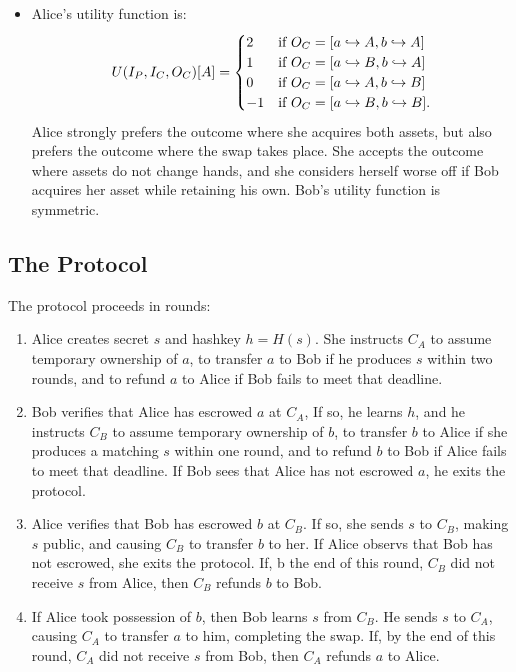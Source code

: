 \begin{itemize}
\item
Alice's utility function is:
\begin{equation}
  \eqnlabel{aliceUtility}
  U(I_P,I_C,O_C)[A] =
  \begin{cases}
    2 &\text{if } O_C = [a \hookrightarrow A, b \hookrightarrow A]\\
    1 &\text{if } O_C = [a \hookrightarrow B, b \hookrightarrow A]\\
    0 &\text{if } O_C = [a \hookrightarrow A, b \hookrightarrow B]\\
    -1 &\text{if } O_C = [a \hookrightarrow B, b \hookrightarrow B].
  \end{cases}
\end{equation}
Alice strongly prefers the outcome where she acquires both assets,
but also prefers the outcome where the swap takes place.
She accepts the outcome where assets do not change hands,
and she considers herself worse off
if Bob acquires her asset while retaining his own.
Bob's utility function is symmetric.
\end{itemize}

\subsection{The Protocol}

The protocol proceeds in rounds:
\begin{enumerate}
\item\label{aliceEscrows}
  Alice creates secret $s$ and hashkey $h=H(s)$.
  She instructs $C_A$ to assume temporary ownership of $a$,
  to transfer $a$ to Bob if he produces $s$ within two rounds,
  and to refund $a$ to Alice if Bob fails to meet that deadline.

\item\label{bobEscrows}
  Bob verifies that Alice has escrowed $a$ at $C_A$,
  If so, he learns $h$,
  and he instructs $C_B$ to assume temporary ownership of $b$,
  to transfer $b$ to Alice if she produces a matching $s$ within one round,
  and to refund $b$ to Bob if Alice fails to meet that deadline.
  If Bob sees that Alice has not escrowed $a$, he exits the protocol.

\item\label{aliceClaims}
  Alice verifies that Bob has escrowed $b$ at $C_B$.
  If so, she sends $s$ to $C_B$, making $s$ public,
  and causing $C_B$ to transfer $b$ to her.
  If Alice observs that Bob has not escrowed, she exits the protocol.
  If, b the end of this round, $C_B$ did not receive $s$ from Alice,
  then $C_B$ refunds $b$ to Bob.

\item\label{bobClaims}
  If Alice took possession of $b$, then Bob learns $s$ from $C_B$.
  He sends $s$ to $C_A$,
  causing $C_A$ to transfer $a$ to him, completing the swap.
  If, by the end of this round, $C_A$ did not receive $s$ from Bob,
  then $C_A$ refunds $a$ to Alice.
\end{enumerate}

